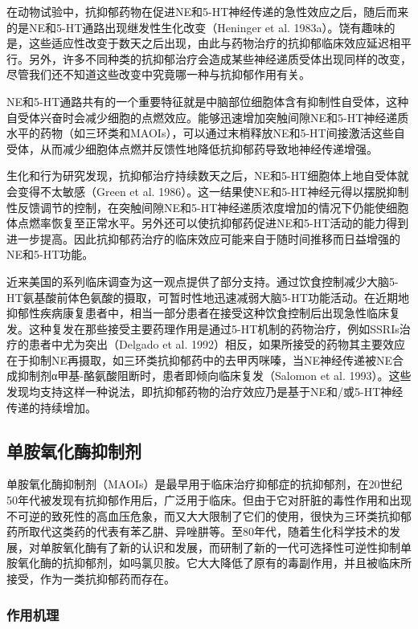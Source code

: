 在动物试验中，抗抑郁药物在促进NE和5-HT神经传递的急性效应之后，随后而来的是NE和5-HT通路出现继发性生化改变（Heninger
et al.
1983a）。饶有趣味的是，这些适应性改变于数天之后出现，由此与药物治疗的抗抑郁临床效应延迟相平行。另外，许多不同种类的抗抑郁治疗会造成某些神经递质受体出现同样的改变，尽管我们还不知道这些改变中究竟哪一种与抗抑郁作用有关。

NE和5-HT通路共有的一个重要特征就是中脑部位细胞体含有抑制性自受体，这种自受体兴奋时会减少细胞的点燃效应。能够迅速增加突触间隙NE和5-HT神经递质水平的药物（如三环类和MAOIs），可以通过末梢释放NE和5-HT间接激活这些自受体，从而减少细胞体点燃并反馈性地降低抗抑郁药导致地神经传递增强。

生化和行为研究发现，抗抑郁治疗持续数天之后，NE和5-HT细胞体上地自受体就会变得不太敏感（Green
et al.
1986）。这一结果使NE和5-HT神经元得以摆脱抑制性反馈调节的控制，在突触间隙NE和5-HT神经递质浓度增加的情况下仍能使细胞体点燃率恢复至正常水平。另外还可以使抗抑郁药促进NE和5-HT活动的能力得到进一步提高。因此抗抑郁药治疗的临床效应可能来自于随时间推移而日益增强的NE和5-HT功能。

近来美国的系列临床调查为这一观点提供了部分支持。通过饮食控制减少大脑5-HT氨基酸前体色氨酸的摄取，可暂时性地迅速减弱大脑5-HT功能活动。在近期地抑郁性疾病康复患者中，相当一部分患者在接受这种饮食控制后出现急性临床复发。这种复发在那些接受主要药理作用是通过5-HT机制的药物治疗，例如SSRIs治疗的患者中尤为突出（Delgado
et al.
1992）相反，如果所接受的药物其主要效应在于抑制NE再摄取，如三环类抗抑郁药中的去甲丙咪嗪，当NE神经传递被NE合成抑制剂α甲基-酪氨酸阻断时，患者即倾向临床复发（Salomon
et al.
1993）。这些发现均支持这样一种说法，即抗抑郁药物的治疗效应乃是基于NE和/或5-HT神经传递的持续增加。

\subsection{单胺氧化酶抑制剂}

单胺氧化酶抑制剂（MAOIs）是最早用于临床治疗抑郁症的抗抑郁剂，在20世纪50年代被发现有抗抑郁作用后，广泛用于临床。但由于它对肝脏的毒性作用和出现不可逆的致死性的高血压危象，而又大大限制了它们的使用，很快为三环类抗抑郁药所取代这类药的代表有苯乙肼、异唑肼等。至80年代，随着生化科学技术的发展，对单胺氧化酶有了新的认识和发展，而研制了新的一代可选择性可逆性抑制单胺氧化酶的抗抑郁剂，如吗氯贝胺。它大大降低了原有的毒副作用，并且被临床所接受，作为一类抗抑郁药而存在。

\subsubsection{作用机理}

